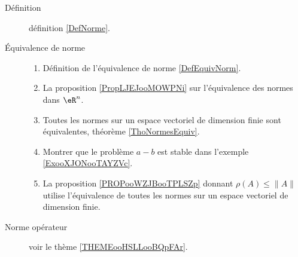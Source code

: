 
      \label{THEMEooUJVXooZdlmHj}


\begin{description}
    \item[Définition] définition \ref{DefNorme}.
    \item[Équivalence de norme] 

        \begin{enumerate}


        \item
            Définition de l'équivalence de norme \ref{DefEquivNorm}.
\item
    La proposition \ref{PropLJEJooMOWPNi} sur l'équivalence des normes dans \( \eR^n\).
\item
    Toutes les normes sur un espace vectoriel de dimension finie sont équivalentes, théorème \ref{ThoNormesEquiv}.
\item
    Montrer que le problème \( a-b\) est stable dans l'exemple \ref{ExooXJONooTAYZVc}.
\item
    La proposition \ref{PROPooWZJBooTPLSZp} donnant \( \rho(A)\leq \| A \|\) utilise l'équivalence de toutes les normes sur un espace vectoriel de dimension finie.
                
        \end{enumerate}

    \item[Norme opérateur] voir le thème \ref{THEMEooHSLLooBQpFAr}.

\end{description}
